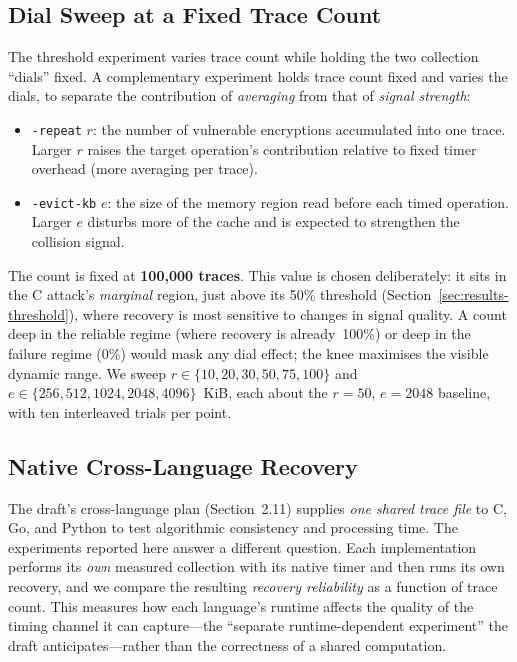 
\subsection{Dial Sweep at a Fixed Trace Count}
\label{sec:method-dial}
The threshold experiment varies trace count while holding the two collection
``dials'' fixed. A complementary experiment holds trace count fixed and varies
the dials, to separate the contribution of \emph{averaging} from that of
\emph{signal strength}:
\begin{itemize}
  \item \texttt{-repeat} $r$: the number of vulnerable encryptions accumulated
        into one trace. Larger $r$ raises the target operation's contribution
        relative to fixed timer overhead (more averaging per trace).
  \item \texttt{-evict-kb} $e$: the size of the memory region read before each
        timed operation. Larger $e$ disturbs more of the cache and is expected
        to strengthen the collision signal.
\end{itemize}
The count is fixed at \textbf{100{,}000 traces}. This value is chosen
deliberately: it sits in the C attack's \emph{marginal} region, just above its
50\% threshold (Section~\ref{sec:results-threshold}), where recovery is most
sensitive to changes in signal quality. A count deep in the reliable regime
(where recovery is already~100\%) or deep in the failure regime (0\%) would
mask any dial effect; the knee maximises the visible dynamic range. We sweep
$r \in \{10,20,30,50,75,100\}$ and $e \in \{256,512,1024,2048,4096\}$~KiB, each
about the $r=50$, $e=2048$ baseline, with ten interleaved trials per point.

\subsection{Native Cross-Language Recovery}
\label{sec:method-crosslang}
The draft's cross-language plan (Section~2.11) supplies \emph{one shared trace
file} to C, Go, and Python to test algorithmic consistency and processing time.
The experiments reported here answer a different question. Each implementation
performs its \emph{own} measured collection with its native timer and then runs
its own recovery, and we compare the resulting \emph{recovery reliability} as a
function of trace count. This measures how each language's runtime affects the
quality of the timing channel it can capture---the ``separate runtime-dependent
experiment'' the draft anticipates---rather than the correctness of a shared
computation.

